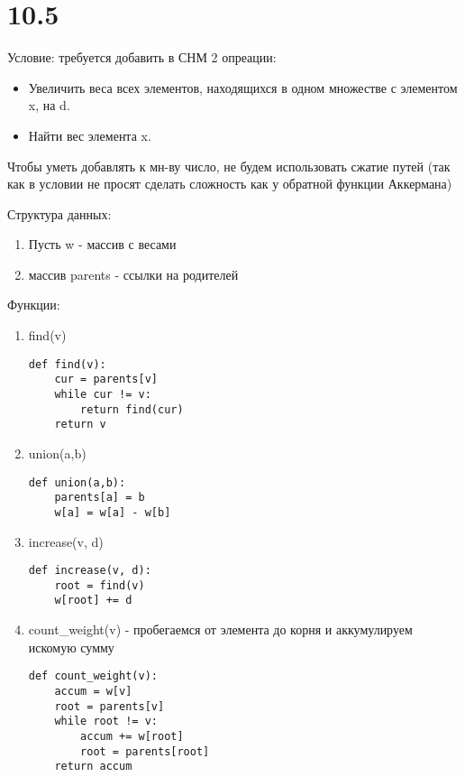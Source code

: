 \documentclass[12pt]{article}
\begin{document}
\section{10.5}
Условие: требуется добавить в СНМ 2 опреации:
\begin{itemize}
    \item Увеличить веса всех элементов, находящихся в одном множестве с элементом x, на d.
    \item Найти вес элемента x.
\end{itemize}

Чтобы уметь добавлять к мн-ву число, не будем использовать сжатие путей (так как в условии не просят сделать сложность как у обратной функции Аккермана)

Структура данных:
\begin{enumerate}
    \item Пусть w - массив с весами
    \item массив parents - ссылки на родителей
\end{enumerate}

Функции:
\begin{enumerate}
    \item find(v)
    \begin{lstlisting}
def find(v):
    cur = parents[v]
    while cur != v:
        return find(cur)
    return v
    \end{lstlisting}
    \item union(a,b) 
    \begin{lstlisting}
def union(a,b):
    parents[a] = b
    w[a] = w[a] - w[b]
    \end{lstlisting}
    \item increase(v, d)
    \begin{lstlisting}
def increase(v, d):
    root = find(v)
    w[root] += d
    \end{lstlisting}
    \item count\_weight(v) - пробегаемся от элемента до корня и аккумулируем искомую сумму
    \begin{lstlisting}
def count_weight(v):
    accum = w[v]
    root = parents[v]
    while root != v:
        accum += w[root]
        root = parents[root]
    return accum
    \end{lstlisting}    
\end{enumerate}
\end{document}
